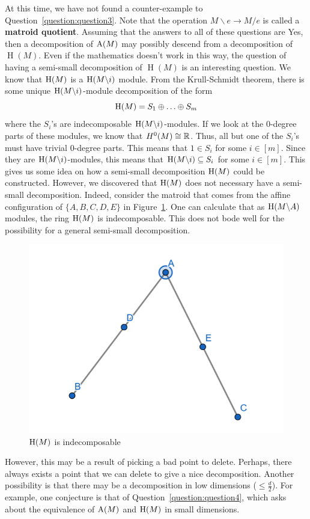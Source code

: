 \documentclass{puthesis-UG}
\begin{document}
At this time, we have not found a counter-example to Question~\ref{question:question3}. Note that the operation $M \backslash e \to M / e$ is called a \textbf{matroid quotient}. Assuming that the answers to all of these questions are Yes, then a decomposition of $\operatorname{A}(M)$ may possibly descend from a decomposition of $\operatorname{H}(M)$. Even if the mathematics doesn't work in this way, the question of having a semi-small decomposition of $\operatorname{H}(M)$ is an interesting question. We know that $\operatorname{H}(M)$ is a $\operatorname{H}(M \backslash i)$ module. From the Krull-Schmidt theorem, there is some unique $\operatorname{H}(M \backslash i)$-module decomposition of the form
\[
	\operatorname{H}(M) = S_1 \oplus \ldots \oplus S_m
\]
where the $S_i$'s are indecomposable $\operatorname{H}(M \backslash i)$-modules. If we look at the $0$-degree parts of these modules, we know that $H^0(M) \cong \mathbb{R}$. Thus, all but one of the $S_i$'s must have trivial $0$-degree parts. This means that $1 \in S_i$ for some $i \in [m]$. Since they are $\operatorname{H}(M \backslash i)$-modules, this means that $\operatorname{H} (M \backslash i) \subseteq S_i$ for some $i \in [m]$. This gives us some idea on how a semi-small decomposition $\operatorname{H}(M)$ could be constructed. However, we discovered that $\operatorname{H}(M)$ does not necessary have a semi-small decomposition. Indeed, consider the matroid that comes from the affine configuration of $\{A, B, C, D, E\}$ in Figure~\ref{fig:indecomposable}. One can calculate that as $\operatorname{H} (M \backslash A)$ modules, the ring $\operatorname{H}(M)$ is indecomposable. This does not bode well for the possibility for a general semi-small decomposition. 
\begin{figure}[h]
	\begin{center}
		\includegraphics[scale = 0.5]{image3.png}
		\caption{$\operatorname{H}(M)$ is indecomposable}
		\label{fig:indecomposable}
	\end{center}
\end{figure}
However, this may be a result of picking a bad point to delete. Perhaps, there always exists a point that we can delete to give a nice decomposition. Another possibility is that there may be a decomposition in low dimensions ($\leq \frac{d}{2}$). For example, one conjecture is that of Question~\ref{question:question4}, which asks about the equivalence of $\operatorname{A}(M)$ and $\operatorname{H}(M)$ in small dimensions. 
\end{document}
